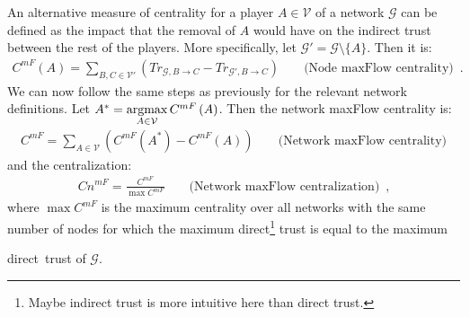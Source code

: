     An alternative measure of centrality for a player $A \in \mathcal{V}$ of a network $\mathcal{G}$ can be defined as the
    impact that the removal of $A$ would have on the indirect trust between the rest of the players. More specifically, let
    $\mathcal{G}' = \mathcal{G} \setminus \{A\}$. Then it is:
    \begin{align*}
      C^{mF}\left(A\right) = \sum\limits_{B,C \in \mathcal{V}'}\left(Tr_{\mathcal{G}, B \rightarrow C} - Tr_{\mathcal{G}', B
      \rightarrow C}\right) && \mbox{ (Node maxFlow centrality)} \enspace.
    \end{align*}
    We can now follow the same steps as previously for the relevant network definitions. Let $A^* = \operatorname*{argmax}\limits_{A \in
    \mathcal{V}}C^{mF}\left(A\right)$. Then the network maxFlow centrality is:
    \begin{align*}
      C^{mF} = \sum\limits_{A \in \mathcal{V}}\left(C^{mF}\left(A^*\right) - C^{mF}\left(A\right)\right) && \mbox{ (Network
      maxFlow centrality)}
    \end{align*}
    and the centralization:
    \begin{align*}
      Cn^{mF} = \frac{C^{mF}}{\max C^{mF}} && \mbox{ (Network maxFlow centralization)} \enspace,
    \end{align*}
    where $\max C^{mF}$ is the maximum centrality over all networks with the same number of nodes for which the maximum
    direct\footnote{Maybe indirect trust is more intuitive here than direct trust.} trust is equal to the maximum
    \addtocounter{footnote}{-1} direct\footnotemark \ trust of $\mathcal{G}$.
